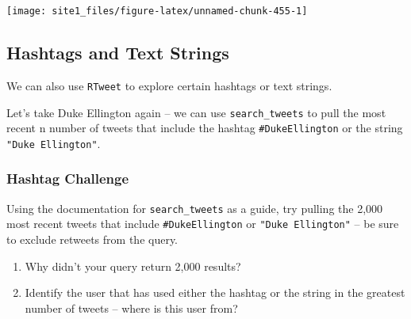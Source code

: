 \documentclass[]{book}
\begin{document}
\begin{center}\texttt{[image: site1\_files/figure-latex/unnamed-chunk-455-1]} \end{center}

\subsection{Hashtags and Text Strings}\label{hashtags-and-text-strings}

We can also use \texttt{RTweet} to explore certain hashtags or text
strings.

Let's take Duke Ellington again -- we can use \texttt{search\_tweets} to
pull the most recent n number of tweets that include the hashtag
\texttt{\#DukeEllington} or the string \texttt{"Duke\ Ellington"}.

\subsubsection*{Hashtag Challenge}\label{hashtag-challenge}

Using the documentation for \texttt{search\_tweets} as a guide, try
pulling the 2,000 most recent tweets that include
\texttt{\#DukeEllington} or \texttt{"Duke\ Ellington"} -- be sure to
exclude retweets from the query.

\begin{enumerate}
\def\labelenumi{\arabic{enumi}.}
\item
  Why didn't your query return 2,000 results?
\item
  Identify the user that has used either the hashtag or the string in
  the greatest number of tweets -- where is this user from?
\end{enumerate}
\end{document}
